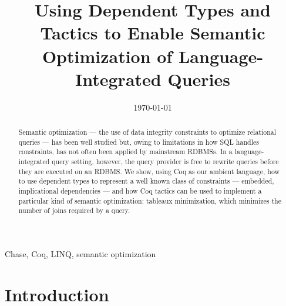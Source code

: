 \documentclass{sigplanconf}
\begin{document}
\title{Using Dependent Types and Tactics to Enable Semantic Optimization of Language-Integrated Queries}



\date{\today}

\maketitle
\begin{abstract}
Semantic optimization --- the use of data integrity constraints to optimize relational queries --- has been well studied but, owing to limitations in how SQL handles constraints, has not often been applied by mainstream RDBMSs. In a language-integrated query setting, however, the query provider is free to rewrite queries before they are executed on an RDBMS.  We show, using Coq as our ambient language, how to use dependent types to represent a well known class of constraints --- embedded, implicational dependencies --- and how Coq tactics can be used to implement a particular kind of semantic optimization: tableaux minimization, which minimizes the number of joins required by a query.
\end{abstract}


\keywords Chase, Coq, LINQ, semantic optimization

\section{Introduction}
\end{document}
